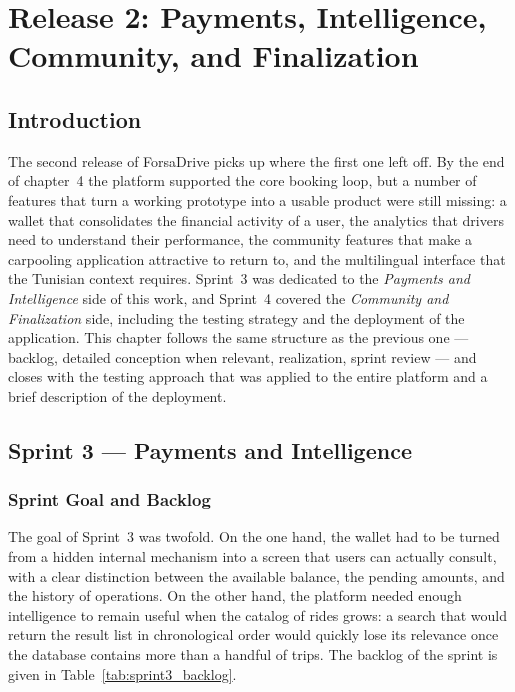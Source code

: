 \chapter{Release 2: Payments, Intelligence, Community, and Finalization}

\clearpage
\section*{Introduction}

The second release of ForsaDrive picks up where the first one left off. By the end of chapter~4 the platform supported the core booking loop, but a number of features that turn a working prototype into a usable product were still missing: a wallet that consolidates the financial activity of a user, the analytics that drivers need to understand their performance, the community features that make a carpooling application attractive to return to, and the multilingual interface that the Tunisian context requires. Sprint~3 was dedicated to the \textit{Payments and Intelligence} side of this work, and Sprint~4 covered the \textit{Community and Finalization} side, including the testing strategy and the deployment of the application. This chapter follows the same structure as the previous one --- backlog, detailed conception when relevant, realization, sprint review --- and closes with the testing approach that was applied to the entire platform and a brief description of the deployment.

\section{Sprint 3 --- Payments and Intelligence}

\subsection{Sprint Goal and Backlog}

The goal of Sprint~3 was twofold. On the one hand, the wallet had to be turned from a hidden internal mechanism into a screen that users can actually consult, with a clear distinction between the available balance, the pending amounts, and the history of operations. On the other hand, the platform needed enough intelligence to remain useful when the catalog of rides grows: a search that would return the result list in chronological order would quickly lose its relevance once the database contains more than a handful of trips. The backlog of the sprint is given in Table~\ref{tab:sprint3_backlog}.

